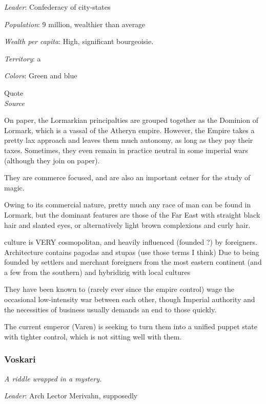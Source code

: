 \textit{Leader}: Confederacy of city-states

\textit{Population}: 9 million, wealthier than average

\textit{Wealth per capita}: High, significant bourgeoisie.

\textit{Territory}: a
    
\textit{Colors}: Green and blue


\begin{rpg-quotebox}
Quote \\ \textendash \textit{Source}
\end{rpg-quotebox}

On paper, the Lormarkian principalties are grouped together as the Dominion of Lormark, which is a vassal of the Atheryn empire.  However, the Empire takes a pretty lax approach and leaves them much autonomy, as long as they pay their taxes. Sometimes, they even remain in practice neutral in some imperial wars (although they join on paper). 

They are commerce focused, and are also an important cetner for the study of magic.

Owing to its commercial nature, pretty much any race of man can be found in Lormark, but the dominant features are those of the Far East with straight black hair and slanted eyes, or alternatively light brown complexions and curly hair.

culture is  VERY cosmopolitan, and heavily influenced (founded ?) by foreigners. Architecture contains pagodas and stupas (use those terms I think) Due to being founded by settlers and merchant foreigners from the most eastern continent (and a few from the southern) and hybridizig with local cultures

They have been known to (rarely ever since the empire control) wage the occasional low-intensity war between each other, though Imperial authority and the necessities of business usually demands an end to those quickly.

The current emperor (Varen) is seeking to turn them into a unified puppet state with tighter control, which is not sitting well with them.

	

\subsubsection{Voskari}

\textit{A riddle wrapped in a mystery.}


\textit{Leader}: Arch Lector Merivahn, supposedly

